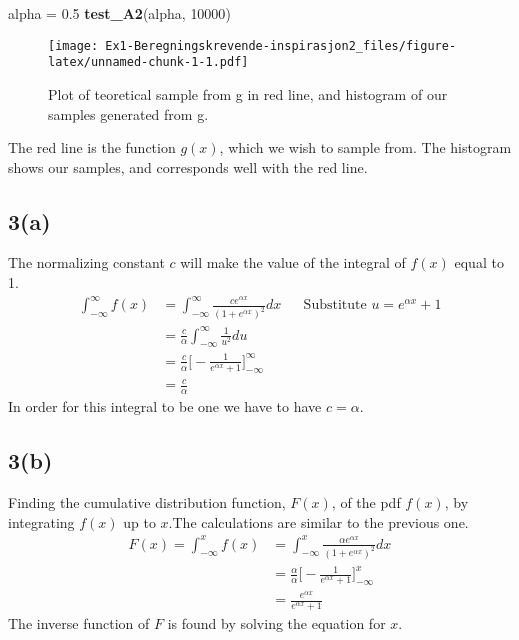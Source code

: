 \documentclass[
]{article}
\newenvironment{Shaded}{\begin{snugshade}}{\end{snugshade}}
\newcommand{\DecValTok}[1]{\textcolor[rgb]{0.00,0.00,0.81}{#1}}
\newcommand{\FloatTok}[1]{\textcolor[rgb]{0.00,0.00,0.81}{#1}}
\newcommand{\KeywordTok}[1]{\textcolor[rgb]{0.13,0.29,0.53}{\textbf{#1}}}
\newcommand{\NormalTok}[1]{#1}
\newcommand{\StringTok}[1]{\textcolor[rgb]{0.31,0.60,0.02}{#1}}
\begin{document}
\begin{Shaded}
\begin{Highlighting}[]
\NormalTok{alpha =}\StringTok{ }\FloatTok{0.5}
\KeywordTok{test_A2}\NormalTok{(alpha, }\DecValTok{10000}\NormalTok{)}
\end{Highlighting}
\end{Shaded}

\begin{figure}
\centering
\texttt{[image: Ex1-Beregningskrevende-inspirasjon2\_files/figure-latex/unnamed-chunk-1-1.pdf]}
\caption{Plot of teoretical sample from g in red line, and histogram of
our samples generated from g.}
\end{figure}

The red line is the function \(g(x)\), which we wish to sample from. The
histogram shows our samples, and corresponds well with the red line.

\hypertarget{a-1}{%
\subsection{3(a)}\label{a-1}}

The normalizing constant \(c\) will make the value of the integral of
\(f(x)\) equal to 1. \[
\begin{aligned}
\int_{-\infty}^{\infty}f(x)&=\int_{-\infty}^{\infty}\frac{ce^{\alpha x}}{(1+e^{\alpha x})^2}dx && \text{Substitute } u=e^{\alpha x}+1\\
&=\frac{c}{\alpha}\int_{-\infty}^{\infty}\frac{1}{u^2}du\\
&=\frac{c}{\alpha}\bigg[-\frac{1}{e^{\alpha x}+1}\bigg]_{-\infty}^{\infty}\\
&=\frac{c}{\alpha}
\end{aligned}
\] In order for this integral to be one we have to have \(c=\alpha\).

\hypertarget{b}{%
\subsection{3(b)}\label{b}}

Finding the cumulative distribution function, \(F(x)\), of the pdf
\(f(x)\), by integrating \(f(x)\) up to \(x\).The calculations are
similar to the previous one. \[
\begin{aligned}
F(x)=\int_{-\infty}^{x}f(x)&=\int_{-\infty}^{x}\frac{\alpha e^{\alpha x}}{(1+e^{\alpha x})^2}dx\\
&=\frac{\alpha}{\alpha}\bigg[-\frac{1}{e^{\alpha x}+1}\bigg]_{-\infty}^{x}\\
&=\frac{e^{\alpha x}}{e^{\alpha x}+1}
\end{aligned}
\] The inverse function of \(F\) is found by solving the equation for
\(x\).
\end{document}
